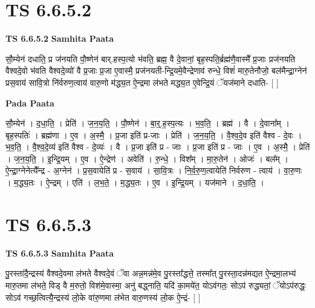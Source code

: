 \documentclass[17pt]{extarticle}
\begin{document}
\section*{ TS 6.6.5.2 }

\textbf{TS 6.6.5.2 } \newline
\textbf{Samhita Paata} \newline

सौ॒म्येन॑ दधाति॒ प्र ज॑नयति पौ॒ष्णेन॑ बार्.हस्प॒त्यो भ॑वति॒ ब्रह्म॒ वै दे॒वानां॒ बृह॒स्पति॒र्ब्रह्म॑णै॒वास्मै᳚ प्र॒जाः प्रज॑नयति वैश्वदे॒वो भ॑वति वैश्वदे॒व्यो॑ वै प्र॒जाः प्र॒जा ए॒वास्मै॒ प्रज॑नयती-न्द्रि॒यमे॒वैन्द्रेणाव॑ रुन्धे॒ विशं॑ मारु॒तेनौजो॒ बल॑मैन्द्रा॒ग्नेन॑ प्रस॒वाय॑ सावि॒त्रो नि॑र्वरुण॒त्वाय॑ वारु॒णो म॑द्ध्य॒त ऐ॒न्द्रमा ल॑भते मद्ध्य॒त ए॒वेन्द्रि॒यं ॅयज॑माने दधाति- [  ] \newline

\textbf{Pada Paata} \newline

सौ॒म्येन॑ । द॒धा॒ति॒ । प्रेति॑ । ज॒न॒य॒ति॒ । पौ॒ष्णेन॑ । बा॒र्॒.ह॒स्प॒त्यः । भ॒व॒ति॒ । ब्रह्म॑ । वै । दे॒वाना᳚म् । बृह॒स्पतिः॑ । ब्रह्म॑णा । ए॒व । अ॒स्मै॒ । प्र॒जा इति॑ प्र-जाः । प्रेति॑ । ज॒न॒य॒ति॒ । वै॒श्व॒दे॒व इति॑ वैश्व - दे॒वः । भ॒व॒ति॒ । वै॒श्व॒दे॒व्य॑ इति॑ वैश्व - दे॒व्यः॑ । वै । प्र॒जा इति॑ प्र - जाः । प्र॒जा इति॑ प्र - जाः । ए॒व । अ॒स्मै॒ । प्रेति॑ । ज॒न॒य॒ति॒ । इ॒न्द्रि॒यम् । ए॒व । ऐ॒न्द्रेण॑ । अवेति॑ । रु॒न्धे॒ । विश᳚म् । मा॒रु॒तेन॑ । ओजः॑ । बल᳚म् । ऐ॒न्द्रा॒ग्नेनेत्यै᳚न्द्र - अ॒ग्नेन॑ । प्र॒स॒वायेति॑ प्र - स॒वाय॑ । सा॒वि॒त्रः । नि॒र्व॒रु॒ण॒त्वायेति॑ निर्वरुण - त्वाय॑ । वा॒रु॒णः । म॒द्ध्य॒तः । ऐ॒न्द्रम् । एति॑ । ल॒भ॒ते॒ । म॒द्ध्य॒तः । ए॒व । इ॒न्द्रि॒यम् । यज॑माने । द॒धा॒ति॒ ।  \newline




\section*{ TS 6.6.5.3 }

\textbf{TS 6.6.5.3 } \newline
\textbf{Samhita Paata} \newline

पु॒रस्ता॑दै॒न्द्रस्य॑ वैश्वदे॒वमा ल॑भते वैश्वदे॒वं ॅवा अन्न॒मन्न॑मे॒व पु॒रस्ता᳚द्धत्ते॒ तस्मा᳚त् पु॒रस्ता॒दन्न॑मद्यत ऐ॒न्द्रमा॒लभ्य॑ मारु॒तमा ल॑भते॒ विड् वै म॒रुतो॒ विश॑मे॒वास्मा॒ अनु॑ बद्ध्नाति॒ यदि॑ का॒मये॑त॒ योऽव॑गतः॒ सोऽप॑ रुद्ध्यतां॒ ॅयोऽप॑रुद्धः॒ सोऽव॑ गच्छ॒त्वित्यै॒न्द्रस्य॑ लो॒के वा॑रु॒णमा ल॑भेत वारु॒णस्य॑ लो॒क ऐ॒न्द्रं- [  ] \newline
\end{document}
